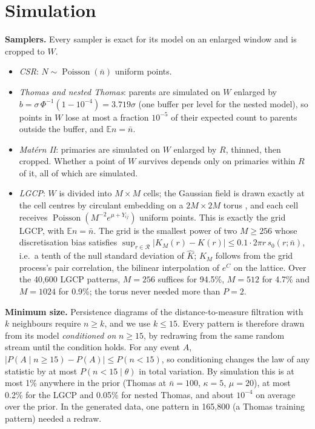\documentclass[10pt,a4paper]{article}
\newcommand{\nbar}{\bar n}
\newcommand{\Pois}{\operatorname{Poisson}}
\newcommand{\E}{\mathbb{E}}
\newcommand{\R}{\mathcal{R}}
\begin{document}
\section{Simulation}\label{sec:sim}

\textbf{Samplers.} Every sampler is exact for its model on an enlarged window and is cropped to $W$.
\begin{itemize}
  \item \emph{CSR}: $N\sim\Pois(\nbar)$ uniform points.
  \item \emph{Thomas and nested Thomas}: parents are simulated on $W$ enlarged by $b=\sigma\,\Phi^{-1}(1-10^{-4})=3.719\sigma$ (one buffer per level for the nested model), so points in $W$ lose at most a fraction $10^{-5}$ of their expected count to parents outside the buffer, and $\E n=\nbar$.
  \item \emph{Mat\'ern II}: primaries are simulated on $W$ enlarged by $R$, thinned, then cropped. Whether a point of $W$ survives depends only on primaries within $R$ of it, all of which are simulated.
  \item \emph{LGCP}: $W$ is divided into $M\times M$ cells; the Gaussian field is drawn exactly at the cell centres by circulant embedding on a $2M\times2M$ torus \citep{WoodChan1994,DietrichNewsam1997}, and each cell receives $\Pois(M^{-2}e^{\mu+Y_{ij}})$ uniform points. This is exactly the grid LGCP, with $\E n=\nbar$. The grid is the smallest power of two $M\ge256$ whose discretisation bias satisfies $\sup_{r\in\R}|K_M(r)-K(r)|\le0.1\cdot2\pi r\,s_0(r;\nbar)$, i.e.\ a tenth of the null standard deviation of $\hat K$; $K_M$ follows from the grid process's pair correlation, the bilinear interpolation of $e^{C}$ on the lattice. Over the 40{,}600 LGCP patterns, $M=256$ suffices for 94.5\%, $M=512$ for 4.7\% and $M=1024$ for 0.9\%; the torus never needed more than $P=2$.
\end{itemize}

\textbf{Minimum size.} Persistence diagrams of the distance-to-measure filtration with $k$ neighbours \citep{Chazal2011} require $n\ge k$, and we use $k\le15$. Every pattern is therefore drawn from its model \emph{conditioned on} $n\ge15$, by redrawing from the same random stream until the condition holds. For any event $A$, $|P(A\mid n\ge15)-P(A)|\le P(n<15)$, so conditioning changes the law of any statistic by at most $P(n<15\mid\theta)$ in total variation. By simulation this is at most 1\% anywhere in the prior (Thomas at $\nbar=100$, $\kappa=5$, $\mu=20$), at most 0.2\% for the LGCP and 0.05\% for nested Thomas, and about $10^{-4}$ on average over the prior. In the generated data, one pattern in 165{,}800 (a Thomas training pattern) needed a redraw.
\end{document}
